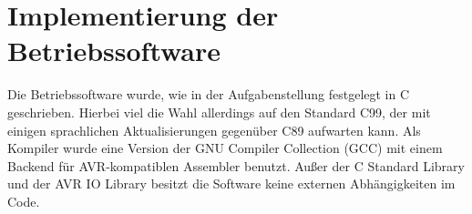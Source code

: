 \chapter{Implementierung der Betriebssoftware}
Die Betriebssoftware wurde, wie in der Aufgabenstellung festgelegt in C geschrieben.
Hierbei viel die Wahl allerdings auf den Standard C99, der mit einigen sprachlichen
Aktualisierungen gegenüber C89 aufwarten kann. Als Kompiler wurde eine Version der
GNU Compiler Collection (GCC) mit einem Backend für AVR-kompatiblen Assembler benutzt.
Außer der C Standard Library und der AVR IO Library besitzt die Software keine externen
Abhängigkeiten im Code.
